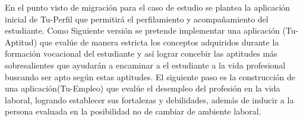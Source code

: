 En el punto visto de migración para el caso de estudio se plantea la aplicación inicial de Tu-Perfil que permitirá el perfilamiento y acompañamiento del estudiante. Como Siguiente versión se pretende implementar una aplicación (Tu-Aptitud) que evalúe de manera estricta los conceptos adquiridos durante la formación vocacional del estudiante y así lograr concebir las aptitudes más sobresalientes que ayudarán a encaminar a el estudiante a la vida profesional buscando ser apto según estas aptitudes. El siguiente paso es la construcción de una aplicación(Tu-Empleo) que evalúe el desempleo del profesión en la vida laboral, logrando establecer sus fortalezas y debilidades, además de inducir a la persona evaluada en la posibilidad no de cambiar de ambiente  laboral.